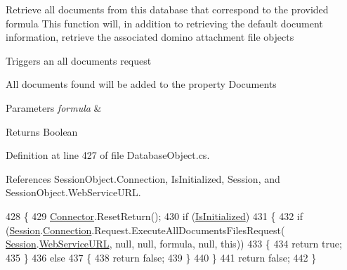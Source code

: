 Retrieve all documents from this database that correspond to the provided formula This function will, in addition to retrieving the default document information, retrieve the associated domino attachment file objects 

Triggers an all documents request

All documents found will be added to the property \textquotesingle{}Documents\textquotesingle{}


\begin{DoxyParams}{Parameters}
{\em formula} & \\
\hline
\end{DoxyParams}
\begin{DoxyReturn}{Returns}
Boolean
\end{DoxyReturn}


Definition at line 427 of file Database\+Object.\+cs.



References Session\+Object.\+Connection, Is\+Initialized, Session, and Session\+Object.\+Web\+Service\+U\+RL.


\begin{DoxyCode}
428     \{
429         \mbox{\hyperlink{class_connector}{Connector}}.ResetReturn();
430         \textcolor{keywordflow}{if} (\mbox{\hyperlink{class_database_object_a5fe036d32a30eb10d1b3f6a30263f740}{IsInitialized}})
431         \{
432             \textcolor{keywordflow}{if} (\mbox{\hyperlink{class_database_object_aa8484162b7d2a7c4c9426bca13c64c07}{Session}}.\mbox{\hyperlink{class_session_object_a014bdbf705a753540e19bfb53030c55c}{Connection}}.Request.ExecuteAllDocumentsFilesRequest(
      \mbox{\hyperlink{class_database_object_aa8484162b7d2a7c4c9426bca13c64c07}{Session}}.\mbox{\hyperlink{class_session_object_a697c071c812fbf7ad1166b896fb44c16}{WebServiceURL}}, null, null, formula, null, \textcolor{keyword}{this}))
433             \{
434                 \textcolor{keywordflow}{return} \textcolor{keyword}{true};
435             \}
436             \textcolor{keywordflow}{else}
437             \{
438                 \textcolor{keywordflow}{return} \textcolor{keyword}{false};
439             \}
440         \}
441         \textcolor{keywordflow}{return} \textcolor{keyword}{false};
442     \}
\end{DoxyCode}
\mbox{\label{class_database_object_a6c2fb05fb6972d74d5bea67e323985fb}} 
